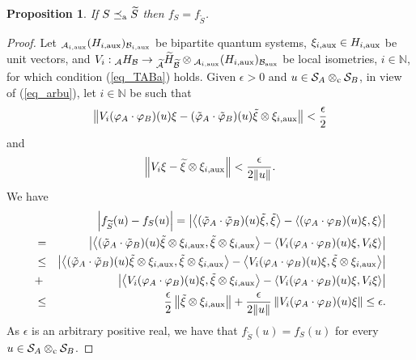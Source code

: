 \documentclass[11pt]{amsart}
\newtheorem{proposition}[theorem]{Proposition}
\theoremstyle{definition}
\newcommand{\cl}[1]{\mathcal{#1}}
\newcommand{\bb}[1]{\mathbb{#1}}
\providecommand{\wt}[1]{\widetilde{#1}}
\begin{document}
\begin{proposition}\label{p_fS=f}
If $S\preceq_{\rm a} \wt{S}$ then $f_S=f_{\wt{S}}$.
\end{proposition}

\begin{proof}
Let 
$_{{\cl A}_{i,\rm aux}}(H_{i,\rm aux})_{{\cl B}_{i,\rm aux}}$ 
be bipartite quantum systems,
$\xi_{i,\rm aux}\in H_{i,\rm aux}$ be unit vectors, and
$V_i : \mbox{}_{\cl A}H_{\cl B}\to
\mbox{}_{\wt{\cl A}}\wt{H}_{\wt{\cl B}}\otimes
\mbox{}_{{\cl A}_{i,\rm aux}}(H_{i,\rm aux})_{{\cl B}_{\rm aux}}$
be local isometries, $i\in \bb{N}$, for which condition (\ref{eq_TABa}) holds. 
Given $\epsilon > 0$ and $u\in \cl S_A\otimes_{\rm c}\cl S_B$, 
in view of (\ref{eq_arbu}), let $i\in \bb{N}$ be such that 
$$\left\|V_i (\varphi_A\cdot\varphi_B)(u) \xi - 
(\tilde\varphi_A\cdot\tilde\varphi_B)(u)\tilde\xi \otimes\xi_{i,\rm aux}\right\| 
< \frac{\epsilon}{2}$$
and 
$$\left\|V_i \xi - \wt{\xi}\otimes \xi_{i,\rm aux}\right\| < \frac{\epsilon}{2\|u\|}.$$
We have 
\begin{eqnarray*}
& & \left|f_{\wt{S}}(u) - f_{S}(u)\right|
= 
\left|\left\langle (\tilde\varphi_A\cdot \tilde\varphi_B)(u)\tilde\xi,\tilde\xi \right\rangle
- \left\langle (\varphi_A\cdot \varphi_B)(u)\xi,\xi \right\rangle\right|\\
& = & 
\left|\left\langle (\tilde\varphi_A\cdot\tilde\varphi_B)(u)\tilde\xi \otimes\xi_{i,\rm aux}, 
\tilde\xi \otimes\xi_{i,\rm aux}\right\rangle
- 
\left\langle V_i(\varphi_A\cdot \varphi_B)(u)\xi,V_i\xi \right\rangle\right|
\\
& \leq &
\left|\left\langle (\tilde\varphi_A\cdot\tilde\varphi_B)(u)\tilde\xi \otimes\xi_{i,\rm aux}, 
\tilde\xi \otimes\xi_{i,\rm aux}\right\rangle
- 
\left\langle V_i(\varphi_A\cdot \varphi_B)(u)\xi,\tilde\xi \otimes\xi_{i,\rm aux} \right\rangle\right|\\
& + & 
\left|\left\langle V_i(\varphi_A\cdot \varphi_B)(u)\xi,\tilde\xi \otimes\xi_{i,\rm aux} \right\rangle
-
\left\langle V_i(\varphi_A\cdot \varphi_B)(u)\xi,V_i\xi \right\rangle
\right|\\
& \leq & 
\frac{\epsilon}{2} \left\|\tilde\xi \otimes\xi_{i,\rm aux}\right\| 
+ \frac{\epsilon}{2\|u\|} \left\|V_i(\varphi_A\cdot \varphi_B)(u)\xi\right\| \leq \epsilon.
\end{eqnarray*}
As $\epsilon$ is an arbitrary positive real, we have that 
$f_{\wt{S}}(u) = f_{S}(u)$ for every $u\in \cl S_A\otimes_{\rm c}\cl S_B$.
\end{proof}
\end{document}
